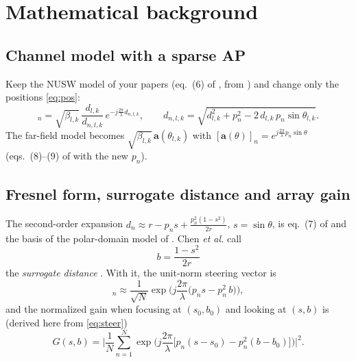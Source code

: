 \documentclass[11pt]{article}
\newcommand{\bb}{\mathbf{b}}
\newcommand{\h}{\mathbf{h}}
\begin{document}
\section{Mathematical background}
\label{sec:math}

\subsection{Channel model with a sparse AP}
Keep the NUSW model of your papers (eq.~(6) of \cite{haider2026vtc}, from \cite{lu2024tutorial}) and change only the positions \eqref{eq:pos}:
\begin{equation}
  [\h^{\rm NF}_{l,k}]_n=\sqrt{\beta_{l,k}}\,\frac{d_{l,k}}{d_{n,l,k}}\,
  e^{-j\frac{2\pi}{\lambda}d_{n,l,k}},\qquad
  d_{n,l,k}=\sqrt{d_{l,k}^2+p_n^2-2\,d_{l,k}\,p_n\sin\theta_{l,k}}.
\end{equation}
The far-field model becomes $\sqrt{\beta_{l,k}}\,\mathbf a(\theta_{l,k})$ with $[\mathbf a(\theta)]_n=e^{j\frac{2\pi}{\lambda}p_n\sin\theta}$ (eqs.~(8)--(9) of \cite{haider2026vtc} with the new $p_n$).

\subsection{Fresnel form, surrogate distance and array gain}
The second-order expansion $d_n\approx r-p_n s+\frac{p_n^2(1-s^2)}{2r}$, $s=\sin\theta$, is eq.~(7) of \cite{haider2026vtc} and the basis of the polar-domain model of \cite{cui2022channel}. Chen \emph{et al.} call
\begin{equation}
  b=\frac{1-s^2}{2r}
  \label{eq:surrogate}
\end{equation}
the \emph{surrogate distance} \cite[eq.~(6)]{chen2024nearfield}. With it, the unit-norm steering vector is
\begin{equation}
  [\bb(s,b)]_n\approx\frac{1}{\sqrt N}\exp\!\Big(j\frac{2\pi}{\lambda}\big(p_n s-p_n^2\,b\big)\Big),
  \label{eq:steer}
\end{equation}
and the normalized gain when focusing at $(s_0,b_0)$ and looking at $(s,b)$ is (derived here from \eqref{eq:steer})
\begin{equation}
  G(s,b)=\Big|\frac1N\sum_{n=1}^N
  \exp\!\Big(j\frac{2\pi}{\lambda}\big[p_n(s-s_0)-p_n^2(b-b_0)\big]\Big)\Big|^2 .
  \label{eq:gain}
\end{equation}
\end{document}
